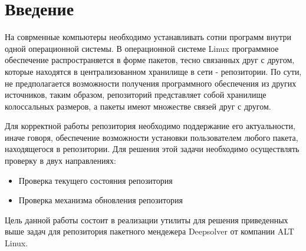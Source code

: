 \section*{Введение}
На соврменные компьютеры необходимо устанавливать сотни программ внутри
одной операционной системы. В операционной системе Linux программное 
обеспечение распространяется в форме пакетов, тесно связанных друг с другом,
которые находятся в централизованном хранилище в сети - репозитории. По
сути, не предполагается возможности получения программного обеспечения из 
других источников, таким образом, репозиторий представляет собой хранилище 
колоссальных размеров, а пакеты имеют множестве связей друг с другом.

Для корректной работы репозитория необходимо поддержание его актуальности, 
иначе говоря, обеспечение возможности установки пользователем любого пакета,
находящегося в репозитории. Для решения этой задачи необходимо осуществлять
проверку в двух направлениях: 
\begin{itemize}
\item{Проверка текущего состояния репозитория}
\item{Проверка механизма обновления репозитория}
\end{itemize}

Цель данной работы состоит в реализации утилиты для решения приведенных
выше задач для репозитория пакетного мендежера Deepsolver от компании
ALT Linux.









